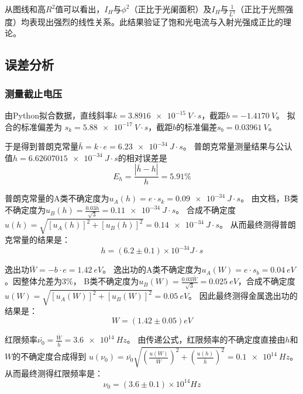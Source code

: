 \documentclass{../template/Report}%
\begin{document}
\begin{fullreportonly}
从图线和高$R^2$值可以看出，$I_H$与$\phi^2$（正比于光阑面积）及$I_H$与$\frac{1}{L^2}$（正比于光照强度）均表现出强烈的线性关系。此结果验证了饱和光电流与入射光强成正比的理论。

\subsection{误差分析}
\subsubsection{测量截止电压}
由Python拟合数据，直线斜率$k = \SI{3.8916e-15}{V\cdot s}$，截距$b = \SI{-1.4170}{V}$。
拟合的标准偏差为 $s_k = \SI{5.88e-17}{V\cdot s}$，截距$b$的标准偏差$s_b = \SI{0.03961}{V}$。

于是得到普朗克常量$\bar{h} = k\cdot e = \SI{6.23e-34}{J\cdot s}$。
普朗克常量测量结果与公认值$h = \SI{6.62607015e-34}{J\cdot s}$的相对误差是
\[E_h = \frac{|\bar{h}-h|}{h} = 5.91\%\]

普朗克常量的A类不确定度为$u_A(h) = e\cdot s_k = \SI{0.09e-34}{J\cdot s}$。
由文档，B类不确定度为$u_B(h) = \frac{0.03\bar{h}}{\sqrt{3}} = \SI{0.11e-34}{J\cdot s}$。
合成不确定度$u(h) = \sqrt{[u_A(h)]^2 + [u_B(h)]^2} = \SI{0.14e-34}{J\cdot s}$。
从而最终测得普朗克常量的结果是：
\[h = (6.2 \pm 0.1)\times 10^{-34} \si{J\cdot s}\]

逸出功$\bar{W} = -b\cdot e = \SI{1.42}{eV}$。
逸出功的A类不确定度为$u_A(W) = e\cdot s_b = \SI{0.04}{eV}$。因整体允差为$3\%$，
B类不确定度为$u_B(W) = \frac{0.03\bar{W}}{\sqrt{3}} = \SI{0.025}{eV}$，合成不确定度$u(W) = \sqrt{[u_A(W)]^2 +[u_B(W)]^2} = \SI{0.05}{eV}$。
因此最终测得金属逸出功的结果是：
\[W = (1.42 \pm 0.05) \si{eV}\]

红限频率$\bar{\nu_0} = \frac{\bar{W}}{\bar{h}} = \SI{3.6e14}{Hz}$。
由传递公式，红限频率的不确定度直接由$h$和$W$的不确定度合成得到
$u(\nu_0) = \bar{\nu_0} \sqrt{\left(\frac{u(W)}{\bar{W}}\right)^2 + \left(\frac{u(h)}{\bar{h}}\right)^2} = \SI{0.1e14}{Hz}$。
从而最终测得红限频率是：
\[\nu_0 = (3.6 \pm 0.1) \times 10^{14} \si{Hz}\]


\end{fullreportonly}
\end{document}
